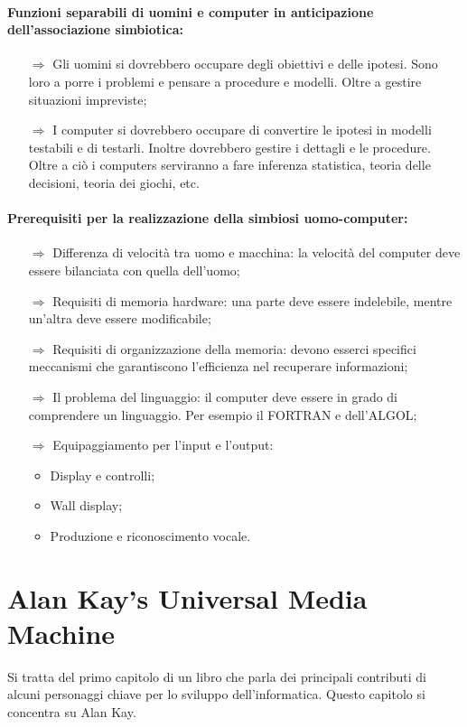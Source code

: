 \paragraph{Funzioni separabili di uomini e computer in anticipazione dell'associazione
simbiotica:} 

\begin{itemize}
    \item [$\Rightarrow$] Gli uomini si dovrebbero occupare degli obiettivi e delle ipotesi.
    Sono loro a porre i problemi e pensare a procedure e modelli. Oltre a gestire situazioni impreviste;
    \item [$\Rightarrow$] I computer si dovrebbero occupare di convertire le ipotesi in modelli 
    testabili e di testarli. Inoltre dovrebbero gestire i dettagli e le procedure. Oltre a ciò 
    i computers serviranno a fare inferenza statistica, teoria delle decisioni, teoria dei giochi, etc.
\end{itemize}

\paragraph{Prerequisiti per la realizzazione della simbiosi uomo-computer:}

\begin{itemize}
    \item [$\Rightarrow$] Differenza di velocità tra uomo e macchina: la velocità del computer 
    deve essere bilanciata con quella dell'uomo;
    \item [$\Rightarrow$] Requisiti di memoria hardware: una parte deve essere indelebile, mentre
    un'altra deve essere modificabile;
    \item [$\Rightarrow$] Requisiti di organizzazione della memoria: devono esserci specifici meccanismi
    che garantiscono l'efficienza nel recuperare informazioni;
    \item [$\Rightarrow$] Il problema del linguaggio: il computer deve essere in grado di comprendere
    un linguaggio. Per esempio il FORTRAN e dell'ALGOL;
    \item [$\Rightarrow$] Equipaggiamento per l'input e l'output:
    \begin{itemize}
        \item Display e controlli;
        \item Wall display;
        \item Produzione e riconoscimento vocale.
    \end{itemize}
\end{itemize}

\section{Alan Kay's Universal Media Machine}

Si tratta del primo capitolo di un libro che parla dei principali
contributi di alcuni personaggi chiave per lo sviluppo dell'informatica.
Questo capitolo si concentra su Alan Kay.







